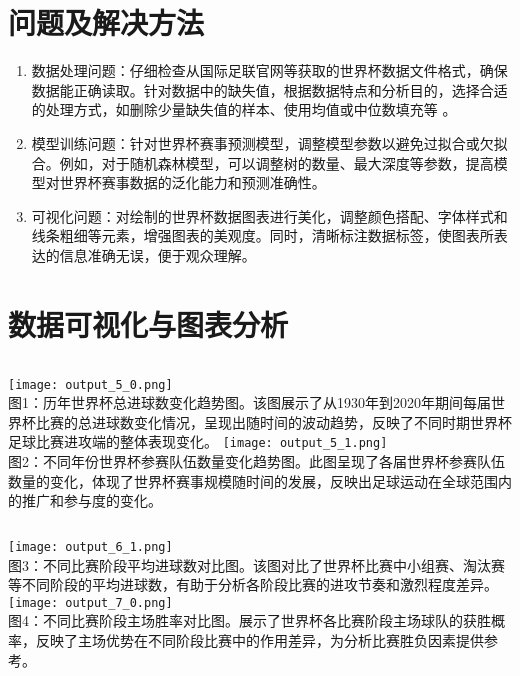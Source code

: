 \documentclass{beamer}
\begin{document}
	\section{问题及解决方法}
	\begin{frame}
		\begin{enumerate}[label=\arabic*.]
			\item 数据处理问题：仔细检查从国际足联官网等获取的世界杯数据文件格式，确保数据能正确读取。针对数据中的缺失值，根据数据特点和分析目的，选择合适的处理方式，如删除少量缺失值的样本、使用均值或中位数填充等 。
			\item 模型训练问题：针对世界杯赛事预测模型，调整模型参数以避免过拟合或欠拟合。例如，对于随机森林模型，可以调整树的数量、最大深度等参数，提高模型对世界杯赛事数据的泛化能力和预测准确性。
			\item 可视化问题：对绘制的世界杯数据图表进行美化，调整颜色搭配、字体样式和线条粗细等元素，增强图表的美观度。同时，清晰标注数据标签，使图表所表达的信息准确无误，便于观众理解。
		\end{enumerate}
	\end{frame}
	
	\section{数据可视化与图表分析}
	\begin{frame}
		\begin{columns}
			\column{0.5\textwidth}
			\centering
			\texttt{[image: output\_5\_0.png]} \\
			\small 图1：历年世界杯总进球数变化趋势图。该图展示了从1930年到2020年期间每届世界杯比赛的总进球数变化情况，呈现出随时间的波动趋势，反映了不同时期世界杯足球比赛进攻端的整体表现变化。
			\column{0.5\textwidth}
			\centering
			\texttt{[image: output\_5\_1.png]} \\
			\small 图2：不同年份世界杯参赛队伍数量变化趋势图。此图呈现了各届世界杯参赛队伍数量的变化，体现了世界杯赛事规模随时间的发展，反映出足球运动在全球范围内的推广和参与度的变化。
		\end{columns}
	\end{frame}
	
	\begin{frame}
		\begin{columns}
			\centering
			\texttt{[image: output\_6\_1.png]} \\
			\small 图3：不同比赛阶段平均进球数对比图。该图对比了世界杯比赛中小组赛、淘汰赛等不同阶段的平均进球数，有助于分析各阶段比赛的进攻节奏和激烈程度差异。
			\centering
			\texttt{[image: output\_7\_0.png]} \\
			\small 图4：不同比赛阶段主场胜率对比图。展示了世界杯各比赛阶段主场球队的获胜概率，反映了主场优势在不同阶段比赛中的作用差异，为分析比赛胜负因素提供参考。
		\end{columns}
	\end{frame}
	
\end{document}
